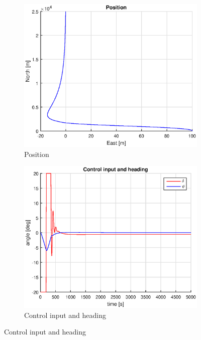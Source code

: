 \begin{figure}[h]
    \centering
    \begin{subfigure}[b]{0.45\textwidth}
        \includegraphics[width=\textwidth]{plots/2_4_pos_PID.eps}
        \caption{Position}
        \label{fig:24_pos_pid}
    \end{subfigure}
    \begin{subfigure}[b]{0.45\textwidth}
        \includegraphics[width=\textwidth]{plots/2_4_ctrl_PID.eps}
        \caption{Control input and heading}
        \label{fig:24_ctrl_pid}
    \end{subfigure}

\end{figure}
